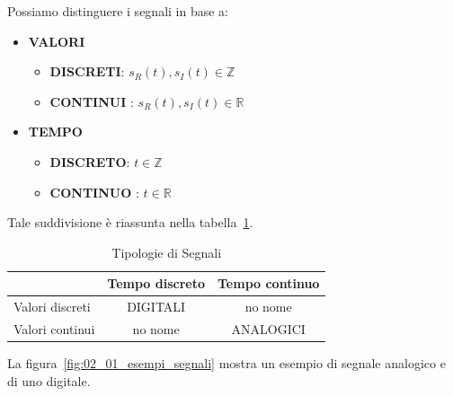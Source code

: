 Possiamo distinguere i segnali in base a:
\begin{itemize}
    \item \textbf{VALORI}
        \begin{itemize}
            \item \textbf{DISCRETI}: $s_R(t),s_I(t)\in \mathbb{Z}$
            \item \textbf{CONTINUI} : $s_R(t),s_I(t)\in \mathbb{R}$
        \end{itemize}
    \item \textbf{TEMPO}
        \begin{itemize}
            \item \textbf{DISCRETO}: $t\in \mathbb{Z}$
            \item \textbf{CONTINUO} : $t\in \mathbb{R}$
        \end{itemize}
\end{itemize}

Tale suddivisione è riassunta nella tabella~\ref{tb:01_01_tipologie_segnali}.

\begin{table}[!ht]
    \centering
    \renewcommand{\arraystretch}{1.6} 
    \begin{tabular}{|l|c|c|}
        \hline
        & Tempo discreto & Tempo continuo \\
        \hline
        
        Valori discreti & \cellcolor{orange!40}DIGITALI & no nome \\
        \hline
        
        Valori continui & no nome & \cellcolor{orange!40}ANALOGICI \\
        \hline
    \end{tabular}
    \caption{Tipologie di Segnali}
    \label{tb:01_01_tipologie_segnali}
\end{table}

La figura~\ref{fig:02_01_esempi_segnali} mostra un esempio di segnale analogico e di uno digitale.

